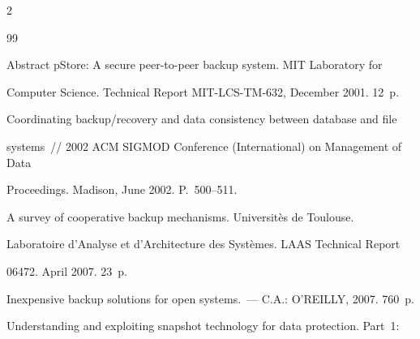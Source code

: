 \begin{multicols}{2}
{{ %




\begin{thebibliography}{99}    


\vspace*{-4pt}









Abstract pStore: A secure peer-to-peer backup system. MIT Laboratory for 


Computer Science. Technical Report MIT-LCS-TM-632, December 2001.  12~p.









Coordinating backup/recovery and data consistency between database and file 


systems~// 2002 ACM SIGMOD  Conference (International) on Management of Data 


Proceedings. Madison, June 2002. P.~500--511.









A survey of cooperative backup mechanisms. Universit\`{e}s de Toulouse. 


Laboratoire d'Analyse et d'Architecture des Syst\`{e}mes. LAAS Technical Report 


06472. April 2007. 23~p.









Inexpensive backup solutions for open systems.~--- C.A.: O'REILLY, 2007. 760~p.









Understanding and exploiting snapshot technology for data protection. Part~1: 



\end{thebibliography}}}
\end{multicols}

